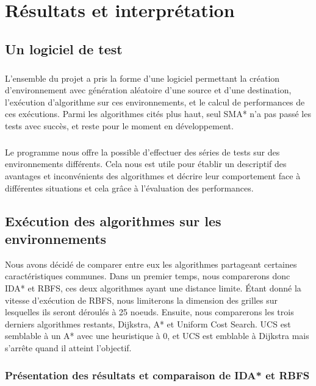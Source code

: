 \documentclass[pidr]{tnreport}
\begin{document}
\chapter{Résultats et interprétation}
	
	\section{Un logiciel de test}	
\paragraph{}
L'ensemble du projet a pris la forme d'une logiciel permettant la création d’environnement avec génération aléatoire d'une source et d'une destination, l’exécution d'algorithme sur ces environnements, et le calcul de performances de ces exécutions. Parmi les algorithmes cités plus haut, seul SMA* n'a pas passé les tests avec succès, et reste pour le moment en développement. 

\paragraph{}
Le programme nous offre la possible d'effectuer des séries de tests sur des environnements différents. Cela nous est utile pour établir un descriptif des avantages et inconvénients des algorithmes et décrire leur comportement face à différentes situations et cela grâce à l'évaluation des performances. 
	
	\section{Exécution des algorithmes sur les environnements}
	
	Nous avons décidé de comparer entre eux les algorithmes partageant certaines caractéristiques communes. \linebreak
	Dans un premier temps, nous comparerons donc IDA* et RBFS, ces deux algorithmes ayant une distance limite. Étant donné la vitesse d'exécution de RBFS, nous limiterons la dimension des grilles sur lesquelles ils seront déroulés à 25 noeuds. \linebreak
	Ensuite, nous comparerons les trois derniers algorithmes restants, Dijkstra, A* et Uniform Cost Search. UCS est semblable à un A* avec une heuristique à 0, et UCS est emblable à Dijkstra mais s'arrête quand il atteint l'objectif. 
	
		\subsection{Présentation des résultats et comparaison de IDA* et RBFS}
\end{document}
